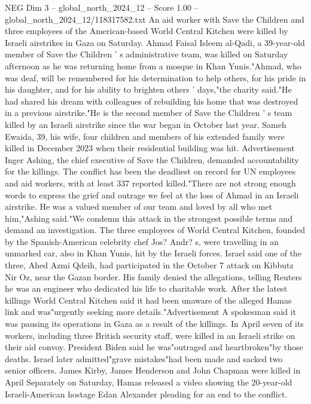 \begin{textsample}{NEG Dim 3 – global\_north\_2024\_12 – Score 1.00 – global\_north\_2024\_12/118317582.txt}  \label{ex:f3_neg_244}
An aid worker with Save the Children and three employees of the American-based World Central Kitchen were killed by Israeli airstrikes in Gaza on Saturday.
Ahmad Faisal Isleem al-Qadi, a 39-year-old member of Save the Children ' s administrative team, was killed on Saturday afternoon as he was returning home from a mosque in Khan Yunis."Ahmad, who was deaf, will be remembered for his determination to help others, for his pride in his daughter, and for his ability to brighten others ' days,"the charity said."He had shared his dream with colleagues of rebuilding his home that was destroyed in a previous airstrike."He is the second member of Save the Children ' s team killed by an Israeli airstrike since the war began in October last year.
Sameh Ewaida, 39, his wife, four children and members of his extended family were killed in December 2023 when their residential building was hit.
Advertisement Inger Ashing, the chief executive of Save the Children, demanded accountability for the killings.
The conflict has been the deadliest on record for UN employees and aid workers, with at least 337 reported killed."There are not strong enough words to express the grief and outrage we feel at the loss of Ahmad in an Israeli airstrike.
He was a valued member of our team and loved by all who met him,"Ashing said."We condemn this attack in the strongest possible terms and demand an investigation.
The three employees of World Central Kitchen, founded by the Spanish-American celebrity chef Jos?
Andr? s, were travelling in an unmarked car, also in Khan Yunis, hit by the Israeli forces.
Israel said one of the three, Ahed Azmi Qdeih, had participated in the October 7 attack on Kibbutz Nir Oz, near the Gazan border.
His family denied the allegations, telling Reuters he was an engineer who dedicated his life to charitable work.
After the latest killings World Central Kitchen said it had been unaware of the alleged Hamas link and was"urgently seeking more details."Advertisement A spokesman said it was pausing its operations in Gaza as a result of the killings.
In April seven of its workers, including three British security staff, were killed in an Israeli strike on their aid convoy.
President Biden said he was"outraged and heartbroken"by those deaths.
Israel later admitted"grave mistakes"had been made and sacked two senior officers.
James Kirby, James Henderson and John Chapman were killed in April Separately on Saturday, Hamas released a video showing the 20-year-old Israeli-American hostage Edan Alexander pleading for an end to the conflict.

\end{textsample}
